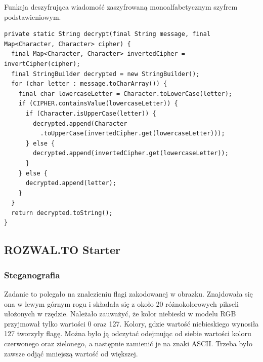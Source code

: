 \documentclass[12pt,a4paper,titlepage]{article}
\begin{document}
\begin{listing}[H]
\caption{Funkcja deszyfrująca wiadomość zaszyfrowaną monoalfabetycznym szyfrem podstawieniowym.}
\begin{verbatim}
private static String decrypt(final String message, final Map<Character, Character> cipher) {
  final Map<Character, Character> invertedCipher = invertCipher(cipher);
  final StringBuilder decrypted = new StringBuilder();
  for (char letter : message.toCharArray()) {
    final char lowercaseLetter = Character.toLowerCase(letter);
    if (CIPHER.containsValue(lowercaseLetter)) {
      if (Character.isUpperCase(letter)) {
        decrypted.append(Character
          .toUpperCase(invertedCipher.get(lowercaseLetter)));
      } else {
        decrypted.append(invertedCipher.get(lowercaseLetter));
      }
    } else {
      decrypted.append(letter);
    }
  }
  return decrypted.toString();
}
\end{verbatim}
\end{listing}

\subsection{ROZWAL.TO Starter}
\subsubsection{Steganografia}
Zadanie to polegało na znalezieniu flagi zakodowanej w obrazku. Znajdowała się ona w lewym górnym rogu i składała się z około 20 różnokolorowych pikseli ułożonych w rzędzie. Należało zauważyć, że kolor niebieski w modelu RGB przyjmował tylko wartości 0 oraz 127. Kolory, gdzie wartość niebieskiego wynosiła 127 tworzyły flagę. Można było ją odczytać odejmując od siebie wartości koloru czerwonego oraz zielonego, a następnie zamienić je na znaki ASCII. Trzeba było zawsze odjąć mniejszą wartość od większej.
\end{document}
